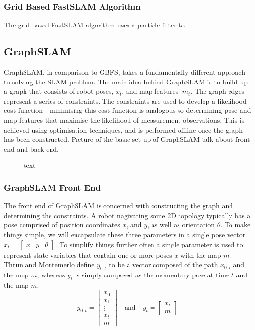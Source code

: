 \documentclass[a4paper]{article}
\begin{document}
\subsubsection{Grid Based FastSLAM Algorithm}
The grid based FastSLAM algorithm uses a particle filter to 

\subsection{GraphSLAM}
GraphSLAM, in comparison to GBFS, takes a fundamentally different approach to solving the SLAM problem. The main idea behind GraphSLAM is to build up a graph that consists of robot poses, $x_t$, and map features, $m_t$. The graph edges represent a series of constraints. The constraints are used to develop a likelihood cost function - minimising this cost function is analogous to determining pose and map features that maximise the likelihood of measurement observations. This is achieved using optimisation techniques, and is performed offline once the graph has been constructed. Picture of the basic set up of GraphSLAM talk about front end and back end.
\begin{figure}[h]
\centering
\caption{text}
\end{figure}


\subsubsection{GraphSLAM Front End}
The front end of GraphSLAM is concerned with constructing the graph and determining the constraints. A robot nagivating some 2D topology typically has a pose comprised of position coordinates $x$, and $y$, as well as orientation $\theta$. To make things simple, we will encapsulate these three parameters in a single pose vector $x_t = \begin{bmatrix} x & y & \theta \end{bmatrix}$. To simplify things further often a single parameter is used to represent state variables that contain one or more poses $x$ with the map $m$. Thrun and Montemerlo define $y_{0:t}$ to be a vector composed of the path $x_{0:t}$ and the map $m$, whereas $y_t$ is simply composed as the momentary pose at time $t$ and the map $m$:
\begin{equation}
y_{0:t} =
\begin{bmatrix}
x_0 \\ x_1 \\ \vdots \\ x_t \\ m
\end{bmatrix}
\quad\mathrm{and}\quad 
y_t =
\begin{bmatrix}
x_t \\ m
\end{bmatrix}
\end{equation}
\end{document}
